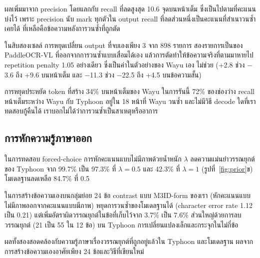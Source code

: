 ผลเพิ่มมาจาก precision โดยแลกกับ recall ที่ลดสูงสุด 10.6 จุดบนหน้าเต็ม ซึ่งเป็นไปตามที่คะแนนบ่งไว้ เพราะ precision นับ mark ทุกตัวใน output recall ที่ลดส่วนหนึ่งเป็นคะแนนที่สำเนาวนซ้ำเคยได้ ที่เหลือคือข้อความหลังการวนซ้ำที่ถูกตัด

ในสิบสองเซลล์ การหยุดเปลี่ยน output ที่จบเองเพียง 3 จาก 898 รายการ สองรายการเป็นของ PaddleOCR-VL ที่ออกจากการวนซ้ำแบบเสื่อมได้เอง แล้วการตัดทำให้ข้อความจริงที่ตามมาหายไป repetition penalty 1.05 อย่างเดียว ซึ่งเป็นค่าในตัวอย่างของ Wayu เอง ไม่ช่วย (+2.8 ช่วง $-$3.6 ถึง +9.6 บนหน้าเต็ม และ $-$11.3 ช่วง $-$22.5 ถึง +4.5 บนข้อความสั้น)

การหยุดประหยัด token ที่สร้าง 34\% บนหน้าเต็มของ Wayu ในการรันนี้ 72\% ของช่องว่าง recall หน้าเต็มระหว่าง Wayu กับ Typhoon อยู่ใน 18 หน้าที่ Wayu วนซ้ำ และไม่มีวิธี decode ใดที่เราทดสอบกู้คืนได้ เราบอกไม่ได้ว่าการวนซ้ำเป็นสาเหตุหรืออาการ

\subsection{การหักความรู้ภาษาออก}
ในการทดสอบ forced-choice การหักคะแนนแบบไม่มีภาพด้วยน้ำหนัก $\lambda$ ลดความแม่นยำวรรณยุกต์ของ Typhoon จาก 99.7\% เป็น 97.3\% ที่ $\lambda=0.5$ และ 42.3\% ที่ $\lambda=1$ (รูปที่~\ref{fig:prior}ข) โมเดลฐานลดเหลือ 84.7\% ที่ 0.5

ในการสร้างข้อความเองบนกลุ่มย่อย 24 ข้อ contrast แบบ M3ID-form ของเรา (หักคะแนนแบบไม่มีภาพออกจากคะแนนแบบมีภาพ) หยุดการวนซ้ำของโมเดลฐานได้ (character error rate 1.12 เป็น 0.21) แต่เพิ่มอัตราผิดวรรณยุกต์ในข้อที่เก็บไว้จาก 3.7\% เป็น 7.6\% ส่วนใหญ่ด้วยการลบวรรณยุกต์ (21 เป็น 55 ใน 12 ข้อ) บน Typhoon การเปลี่ยนแปลงเล็กและกระจุกในไม่กี่ข้อ

ผลทั้งสองสอดคล้องกับความรู้ภาษาเรื่องวรรณยุกต์ที่ถูกอยู่แล้วใน Typhoon และโมเดลฐาน ผลจากการสร้างข้อความเองอาศัยเพียง 24 ข้อและวิธีที่เขียนใหม่

